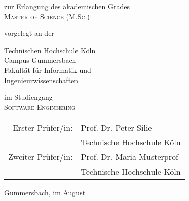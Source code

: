 \begin{titlepage}
\begin{center}
\vspace{1.2cm}

\begin{large}
zur Erlangung des akademischen Grades\\
\vspace{0.1cm}
\textsc{Master of Science (M.Sc.)}\\ 
\end{large}

\vspace{0.6cm}

\begin{large}
vorgelegt an der\\ 
\vspace{0.2cm}
\begin{scshape}
Technischen Hochschule Köln\\
Campus Gummersbach\\
Fakultät für Informatik und\\
Ingenieurwissenschaften\\
\end{scshape}
\end{large}

\vspace{0.6cm}

\begin{large}
im Studiengang\\ 
\vspace{0.1cm}
\textsc{Software Engineering}
\end{large}


\vspace{1.2cm}

\begin{tabular}{rl}
        Erster Prüfer/in:  &  Prof. Dr. Peter Silie\\
       					&  \small Technische Hochschule Köln \\[1.0em]
       Zweiter Prüfer/in:  &  Prof. Dr. Maria Musterprof\\
       					&  \small Technische Hochschule Köln\\
\end{tabular}

\vspace{0.64cm}

\begin{large}
Gummersbach, im August \the\year
\end{large}


\end{center}
\end{titlepage}
